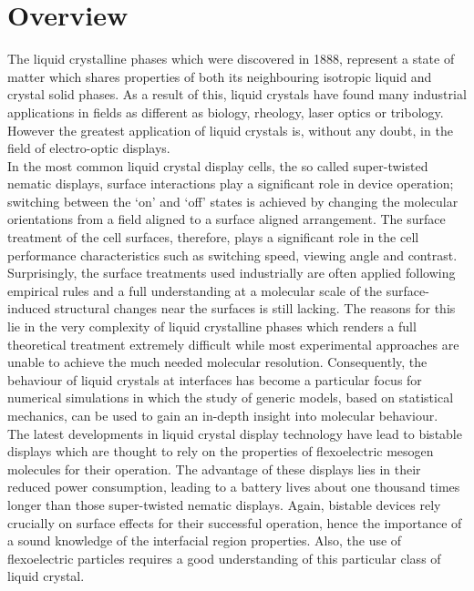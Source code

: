 

\section{Overview}

The liquid crystalline phases which were discovered in 1888, represent a state of matter which shares
properties of both its neighbouring isotropic liquid and crystal solid phases.
As a result of this, liquid crystals have found many industrial applications in fields as
different as biology, rheology, laser optics or tribology. However the greatest application of
liquid crystals is, without any doubt, in the field of electro-optic displays.\\

In the most common liquid crystal display cells, the so called super-twisted nematic displays,
surface interactions play a significant role in device operation; switching
between the `on' and `off' states is achieved by changing the molecular orientations from a
field aligned to a surface aligned arrangement. The surface treatment of the cell surfaces,
therefore, 
plays a significant role in the cell performance characteristics such as switching
speed, viewing angle and contrast. Surprisingly, the surface treatments used industrially 
are often applied following empirical rules and a full understanding at a molecular scale of 
the surface-induced structural changes near the surfaces is still lacking. The reasons for this 
lie in the very complexity of liquid crystalline phases which renders a full theoretical treatment
extremely difficult while most experimental approaches are unable to achieve the much needed 
molecular resolution. 
Consequently, the behaviour of liquid crystals at interfaces has become a particular
focus for numerical simulations in which the study of generic models, based on statistical 
mechanics, can be used to gain an in-depth insight into molecular behaviour.\\

The latest developments in liquid crystal display technology have lead to bistable displays
which are thought to rely on the properties of flexoelectric mesogen molecules for their
operation. The advantage of these
displays lies in their reduced power consumption, leading to a battery lives about one thousand
times longer than those super-twisted nematic displays.  Again, bistable devices rely crucially
on surface effects for their successful operation, hence the importance of a sound knowledge 
of the interfacial region properties. Also, the use of flexoelectric particles requires a 
good understanding of this particular class of liquid crystal.



